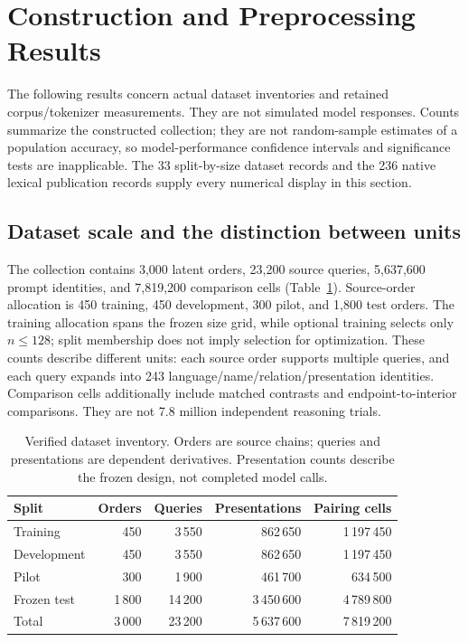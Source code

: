 \section{Construction and Preprocessing Results}

The following results concern actual dataset inventories and retained corpus/tokenizer measurements. They
are not simulated model responses. Counts summarize the constructed collection; they are not random-sample
estimates of a population accuracy, so model-performance confidence intervals and significance tests are
inapplicable. The 33 split-by-size dataset records and the 236 native lexical publication records supply
every numerical display in this section.

\subsection{Dataset scale and the distinction between units}

The collection contains 3,000 latent orders, 23,200 source queries, 5,637,600 prompt identities, and
7,819,200 comparison cells (Table~\ref{tab:inventory}). Source-order allocation is 450 training, 450
development, 300 pilot, and 1,800 test orders. The training allocation spans the frozen size grid, while optional training selects only
$n \le 128$; split membership does not imply selection for optimization. These counts describe different
units: each source order supports multiple queries, and each query expands into 243
language/name/relation/presentation identities. Comparison cells additionally include matched contrasts and
endpoint-to-interior comparisons. They are not 7.8 million independent reasoning trials.

\begin{table}[t]
  \centering
  \caption{Verified dataset inventory. Orders are source chains; queries and presentations are dependent
  derivatives. Presentation counts describe the frozen design, not completed model calls.}
  \label{tab:inventory}
  \small
  \begin{tabular}{@{}lrrrr@{}}
    \toprule
    Split & Orders & Queries & Presentations & Pairing cells \\
    \midrule
    Training    &   450 &  3\,550 &   862\,650 & 1\,197\,450 \\
    Development &   450 &  3\,550 &   862\,650 & 1\,197\,450 \\
    Pilot       &   300 &  1\,900 &   461\,700 &   634\,500 \\
    Frozen test & 1\,800 & 14\,200 & 3\,450\,600 & 4\,789\,800 \\
    \midrule
    Total       & 3\,000 & 23\,200 & 5\,637\,600 & 7\,819\,200 \\
    \bottomrule
  \end{tabular}
\end{table}

